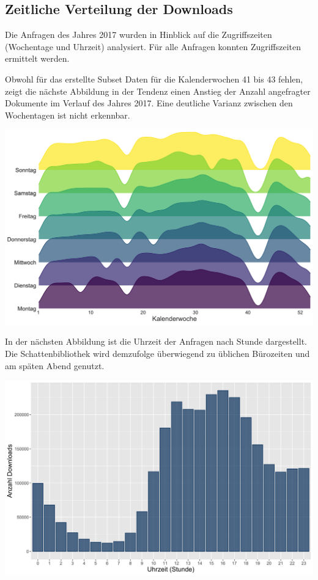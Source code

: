 \documentclass[a4paper,
fontsize=11pt,
oneside,
numbers=noperiodatend,
parskip=half-,
bibliography=totoc,
final
]{scrartcl}
\begin{document}
\hypertarget{zeitliche-verteilung-der-downloads}{%
\subsection{Zeitliche Verteilung der
Downloads}\label{zeitliche-verteilung-der-downloads}}

Die Anfragen des Jahres 2017 wurden in Hinblick auf die Zugriffszeiten
(Wochentage und Uhrzeit) analysiert. Für alle Anfragen konnten
Zugriffszeiten ermittelt werden.

Obwohl für das erstellte Subset Daten für die Kalenderwochen 41 bis 43
fehlen, zeigt die nächste Abbildung in der Tendenz einen Anstieg der
Anzahl angefragter Dokumente im Verlauf des Jahres 2017. Eine deutliche
Varianz zwischen den Wochentagen ist nicht erkennbar.

\includegraphics{images/Downloads_Wochentage.png}

In der nächsten Abbildung ist die Uhrzeit der Anfragen nach Stunde
dargestellt. Die Schattenbibliothek wird demzufolge überwiegend zu
üblichen Bürozeiten und am späten Abend genutzt.

\includegraphics{images/Downloads_Uhrzeit.png}
\end{document}
